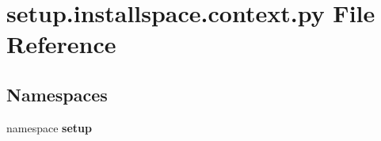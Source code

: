 \section{setup.\-installspace.\-context.\-py \-File \-Reference}
\label{setup_8installspace_8context_8py}
\subsection*{\-Namespaces}
\begin{DoxyCompactItemize}
\item 
namespace {\bf setup}
\end{DoxyCompactItemize}
